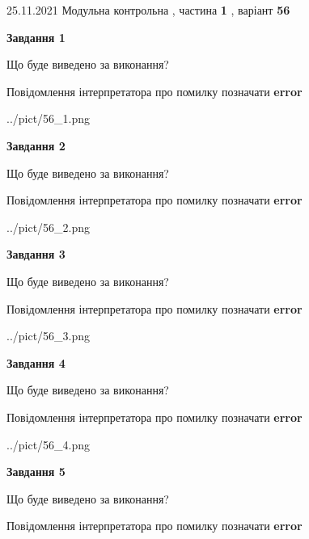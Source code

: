 \documentclass[10pt, ukrainian]{article}
\begin{document}
{25.11.2021 Модульна контрольна , частина \textbf { 1 }, варіант  \No \textbf { 56 }\par}
{
\begin {large}

{\begin {center}\textbf{Завдання 1}\end {center}}\par
Що буде виведено за виконання? \par
Повідомлення інтерпретатора про помилку позначати \textbf{error}

\begin{center}
	{../pict/56_1.png}
\end{center}
\newpage

{\begin {center}\textbf{Завдання 2}\end {center}}\par
Що буде виведено за виконання? \par
Повідомлення інтерпретатора про помилку позначати \textbf{error}

\begin{center}
	{../pict/56_2.png}
\end{center}
\newpage

{\begin {center}\textbf{Завдання 3}\end {center}}\par
Що буде виведено за виконання? \par
Повідомлення інтерпретатора про помилку позначати \textbf{error}

\begin{center}
	{../pict/56_3.png}
\end{center}
\newpage

{\begin {center}\textbf{Завдання 4}\end {center}}\par
Що буде виведено за виконання? \par
Повідомлення інтерпретатора про помилку позначати \textbf{error}

\begin{center}
	{../pict/56_4.png}
\end{center}
\newpage

{\begin {center}\textbf{Завдання 5}\end {center}}\par
Що буде виведено за виконання? \par
Повідомлення інтерпретатора про помилку позначати \textbf{error}


\end{large}}
\end{document}

